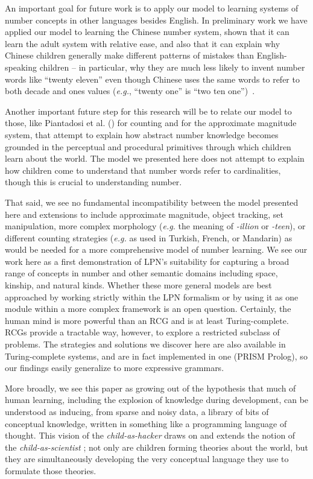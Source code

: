 \documentclass[10pt,letterpaper]{article}
\begin{document}
An important goal for future work is to apply our model to learning
systems of number concepts in other languages besides English.  In
preliminary work we have applied our model to learning the Chinese
number system, shown that it can learn the adult system with relative
ease, and also that it can explain why Chinese children generally make
different patterns of mistakes than English-speaking children -- in
particular, why they are much less likely to invent number words like
``twenty eleven'' even though Chinese uses the same words to refer to
both decade and ones values ({\it e.g.}, ``twenty one'' is ``two ten one'')~\citep{miller1987counting}.

Another important future step for this research will be to relate our
model to those, like Piantadosi et al. (\citeyear{PianGoodTen2012})
for counting and \citet{dehaene2011number} for the approximate magnitude system,
that attempt to explain how abstract number knowledge becomes grounded
in the perceptual and procedural primitives through which children
learn about the world. The model we presented here does not attempt to
explain how children come to understand that number words refer to
cardinalities, though this is crucial to understanding number.

That said, we see no fundamental incompatibility between the model
presented here and extensions to include approximate magnitude, object
tracking, set manipulation, more complex morphology ({\it e.g.} the
meaning of \emph{-illion} or \emph{-teen}), or different counting
strategies ({\it e.g.} as used in Turkish, French, or Mandarin) as
would be needed for a more comprehensive model of number learning. We
see our work here as a first demonstration of LPN's suitability for
capturing a broad range of concepts in number and other semantic
domains including space, kinship, and natural kinds.  Whether these
more general models are best approached by working strictly within the
LPN formalism or by using it as one module within a more complex
framework is an open question. Certainly, the human mind is more
powerful than an RCG and is at least Turing-complete.  RCGs provide a
tractable way, however, to explore a restricted subclass of
problems. The strategies and solutions we discover here are also
available in Turing-complete systems, and are in fact implemented in
one (PRISM Prolog), so our findings easily generalize to more
expressive grammars.

More broadly, we see this paper as growing out of the hypothesis that
much of human learning, including the explosion of knowledge during
development, can be understood as inducing, from sparse and noisy data,
a library of bits of conceptual knowledge, written in something like a
programming language of thought. This vision of the
\emph{child-as-hacker} draws on and extends the notion of the
\emph{child-as-scientist} \citep{gopnik1996scientist}; not only are
children forming theories about the world, but they are simultaneously
developing the very conceptual language they use to formulate those
theories.
\end{document}
